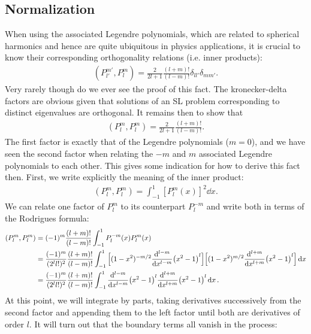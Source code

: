 \subsection{Normalization}

When using the associated Legendre polynomials, which are related to spherical harmonics and hence are quite ubiquitous in physics applications, it is crucial to know their corresponding orthogonality relations (i.e. inner products):
\begin{eqnarray}
    (P_{l'}^{m'},P_{l}^{m}) = \frac{2}{2l+1} \frac{(l+m)!}{(l-m)!} \delta_{ll'} \delta_{mm'}
.\end{eqnarray}
Very rarely though do we ever see the proof of this fact.
The kronecker-delta factors are obvious given that solutions of an SL problem corresponding to distinct eigenvalues are orthogonal.
It remains then to show that
\begin{eqnarray}
    (P_{l}^{m},P_{l}^{m}) = \frac{2}{2l+1} \frac{(l+m)!}{(l-m)!}
.\end{eqnarray}
The first factor is exactly that of the Legendre polynomials ($m = 0$), and we have seen the second factor when relating the $-m$ and $m$ associated Legendre polynomials to each other.
This gives some indication for how to derive this fact then.
First, we write explicitly the meaning of the inner product:
\begin{eqnarray}
    (P_{l}^{m},P_{l}^{m}) = \int_{-1}^{1} [P_{l}^{m}(x)]^2 \dd{x}
.\end{eqnarray}
We can relate one factor of $P_{l}^{m}$ to its counterpart $P_{l}^{-m}$ and write both in terms of the Rodrigues formula:
\begin{align}
    (P_{l}^{m},P_{l}^{m}) &= (-1)^{m}\frac{(l+m)!}{(l-m)!} \int_{-1}^{1} P_{l}^{-m}(x) P_{l}^{m}(x) \nonumber \\
                          &= \frac{(-1)^{m}}{(2^{l} l!)^2} \frac{(l+m)!}{(l-m)!} \int_{-1}^{1} \Big[ (1-x^2)^{-m/2} \dv[l-m]{x} (x^2 - 1)^{l} \Big] \Big[ (1 - x^2)^{m/2} \dv[l+m]{x} (x^2 - 1)^{l} \Big] \dd{x} \nonumber \\
                          &= \frac{(-1)^{m}}{(2^{l} l!)^{2}} \frac{(l+m)!}{(l-m)!} \int_{-1}^{1} \dv[l-m]{x} (x^2 - 1)^{l} \dv[l+m]{x} (x^2 - 1)^{l} \dd{x}
.\end{align}
At this point, we will integrate by parts, taking derivatives successively from the second factor and appending them to the left factor until both are derivatives of order $l$.
It will turn out that the boundary terms all vanish in the process:
